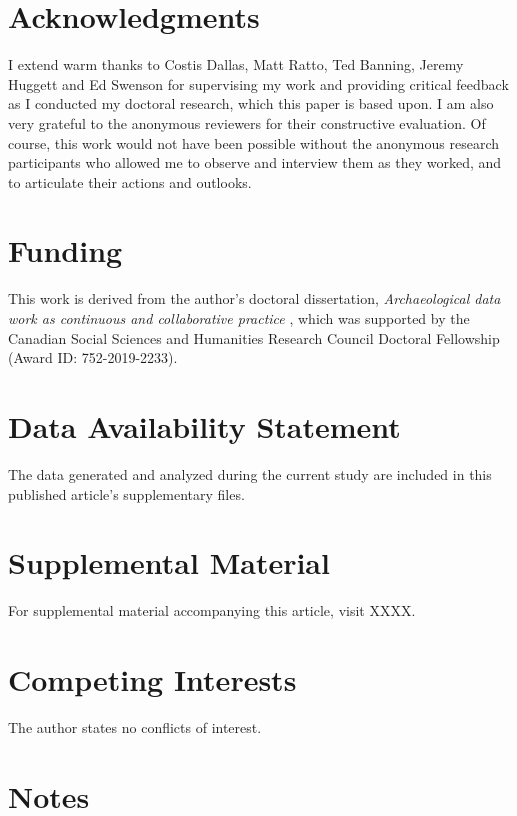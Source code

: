 \documentclass{article}
\begin{document}
\section{Acknowledgments}\label{acknowledgments}

I extend warm thanks to Costis Dallas, Matt Ratto, Ted Banning, Jeremy Huggett and Ed Swenson for supervising my work and providing critical feedback as I conducted my doctoral research, which this paper is based upon.
I am also very grateful to the anonymous reviewers for their constructive evaluation.
Of course, this work would not have been possible without the anonymous research participants who allowed me to observe and interview them as they worked, and to articulate their actions and outlooks.

\section{Funding}\label{funding}

This work is derived from the author's doctoral dissertation, \emph{Archaeological data work as continuous and collaborative practice} \parencite{batist2023a}, which was supported by the Canadian Social Sciences and Humanities Research Council Doctoral Fellowship (Award ID: 752-2019-2233).

\section{Data Availability Statement}\label{data-availability-statement}

The data generated and analyzed during the current study are included in this published article's supplementary files.

\section{Supplemental Material}\label{supplemental-material}

For supplemental material accompanying this article, visit XXXX.

\section{Competing Interests}\label{competing-interests}

The author states no conflicts of interest.

\newpage
\section{Notes}
\end{document}
